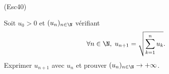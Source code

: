 \begin{tiny}(Esc40)\end{tiny} Soit $u_0 >0$ et $(u_n)_{n \in \N}$ vérifiant
\[
  \forall n \in \N, \;
  u_{n+1} = \sqrt{\sum_{k=1}^n u_k}.
\]
Exprimer $u_{n+1}$ avec $u_n$ et prouver $(u_n)_{n \in \N} \rightarrow + \infty$.

